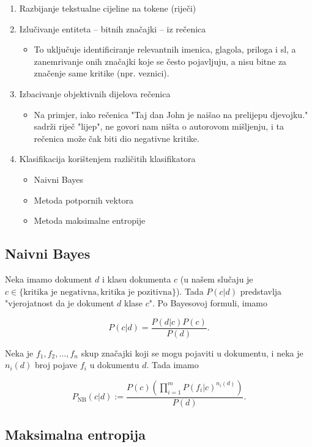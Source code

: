 \documentclass[12pt,a4paper,titlepage]{article}
\begin{document}
\begin{enumerate}
  \item Razbijanje tekstualne cijeline na tokene (riječi)
  \item Izlučivanje entiteta -- bitnih značajki -- iz rečenica
    \begin{itemize}
      \item To uključuje identificiranje relevantnih imenica, glagola, priloga i sl, a zanemrivanje onih značajki koje se često pojavljuju, a nisu bitne za značenje same kritike (npr. veznici).
    \end{itemize}
  \item Izbacivanje objektivnih dijelova rečenica
    \begin{itemize}
      \item Na primjer, iako rečenica "Taj dan John je naišao na prelijepu djevojku." sadrži riječ "lijep", ne govori nam ništa o autorovom mišljenju, i ta rečenica može čak biti dio negativne kritike.
    \end{itemize}
  \item Klasifikacija korištenjem različitih klasifikatora
    \begin{itemize}
      \item Naivni Bayes
      \item Metoda potpornih vektora
      \item Metoda maksimalne entropije
    \end{itemize}
\end{enumerate}

\subsection{Naivni Bayes}

Neka imamo dokument $d$ i klasu dokumenta $c$ (u našem slučaju je $c \in \{\text{kritika je negativna}, \text{kritika je pozitivna}\}$). Tada $P(c|d)$ predstavlja "vjerojatnost da je dokument $d$ klase $c$". Po Bayesovoj formuli, imamo

\[
  P(c|d) = \frac{P(d|c)P(c)}{P(d)}.
\]

Neka je $f_1, f_2, \ldots, f_n$ skup značajki koji se mogu pojaviti u dokumentu, i neka je $n_i(d)$ broj pojave $f_i$ u dokumentu $d$. Tada imamo

\[
  P_\text{NB}(c|d) := \frac{P(c)\left(\prod_{i=1}^{m} P(f_i|c)^{n_i(d)}\right)}{P(d)}.
\]

\subsection{Maksimalna entropija}
\end{document}
